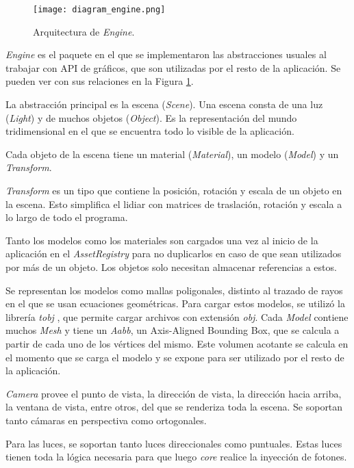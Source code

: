 \begin{figure}[ht]
    \centering
    \texttt{[image: diagram\_engine.png]}
    \caption{Arquitectura de \textit{Engine}.}
    \label{fig:engine_architecture}
\end{figure}

\textit{Engine} es el paquete en el que se implementaron las abstracciones usuales al trabajar con API de gráficos, que son utilizadas por el resto de la aplicación.
Se pueden ver con sus relaciones en la Figura \ref{fig:engine_architecture}.

La abstracción principal es la escena (\textit{Scene}).
Una escena consta de una luz (\textit{Light}) y de muchos objetos (\textit{Object}).
Es la representación del mundo tridimensional en el que se encuentra todo lo visible de la aplicación.

Cada objeto de la escena tiene un material (\textit{Material}), un modelo (\textit{Model}) y un \textit{Transform}.

\textit{Transform} es un tipo que contiene la posición, rotación y escala de un objeto en la escena.
Esto simplifica el lidiar con matrices de traslación, rotación y escala a lo largo de todo el programa.

Tanto los modelos como los materiales son cargados una vez al inicio de la aplicación en el \textit{AssetRegistry} para no duplicarlos en caso de que sean utilizados por más de un objeto.
Los objetos solo necesitan almacenar referencias a estos.

Se representan los modelos como mallas poligonales, distinto al trazado de rayos en el que se usan ecuaciones geométricas.
Para cargar estos modelos, se utilizó la librería \textit{tobj} \cite{tobj-crate}, que permite cargar archivos con extensión \textit{obj}.
Cada \textit{Model} contiene muchos \textit{Mesh} y tiene un \textit{Aabb}, un Axis-Aligned Bounding Box, que se calcula a partir de cada uno de los vértices del mismo.
Este volumen acotante se calcula en el momento que se carga el modelo y se expone para ser utilizado por el resto de la aplicación.

\textit{Camera} provee el punto de vista, la dirección de vista, la dirección hacia arriba, la ventana de vista, entre otros, del que se renderiza toda la escena.
Se soportan tanto cámaras en perspectiva como ortogonales.

Para las luces, se soportan tanto luces direccionales como puntuales.
Estas luces tienen toda la lógica necesaria para que luego \textit{core} realice la inyección de fotones.

